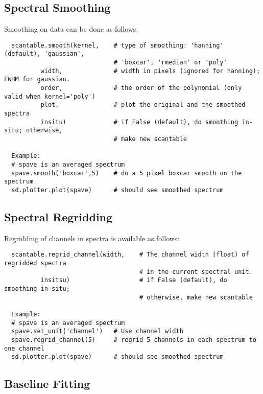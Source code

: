 \subsection{Spectral Smoothing}
\label{subsection:sd.asap.smoothing}

Smoothing on data can be done as follows:

\small
\begin{verbatim}
  scantable.smooth(kernel,    # type of smoothing: 'hanning' (default), 'gaussian',
                              # 'boxcar', 'rmedian' or 'poly'
          width,              # width in pixels (ignored for hanning); FWHM for gaussian.
          order,              # the order of the polynomial (only valid when kernel='poly')
          plot,               # plot the original and the smoothed spectra
          insitu)             # if False (default), do smoothing in-situ; otherwise, 
                              # make new scantable

  Example:
  # spave is an averaged spectrum
  spave.smooth('boxcar',5)    # do a 5 pixel boxcar smooth on the spectrum
  sd.plotter.plot(spave)      # should see smoothed spectrum
\end{verbatim}
\normalsize

\subsection{Spectral Regridding}
\label{subsection:sd.asap.regridchannel}

Regridding of channels in spectra is available as follows:
\small
\begin{verbatim}
  scantable.regrid_channel(width,    # The channel width (float) of regridded spectra 
                                     # in the current spectral unit.
          insitsu)                   # if False (default), do smoothing in-situ;
                                     # otherwise, make new scantable

  Example:
  # spave is an averaged spectrum
  spave.set_unit('channel')   # Use channel width
  spave.regrid_channel(5)     # regrid 5 channels in each spectrum to one channel 
  sd.plotter.plot(spave)      # should see smoothed spectrum
\end{verbatim}
\normalsize

\subsection{Baseline Fitting}
\label{subsection:sd.asap.BLfitting}

